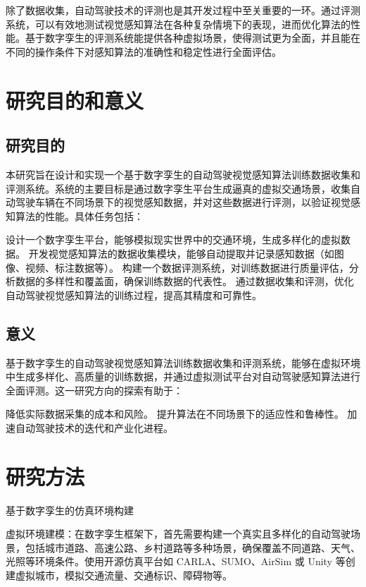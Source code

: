 除了数据收集，自动驾驶技术的评测也是其开发过程中至关重要的一环。通过评测系统，可以有效地测试视觉感知算法在各种复杂情境下的表现，进而优化算法的性能。基于数字孪生的评测系统能提供各种虚拟场景，使得测试更为全面，并且能在不同的操作条件下对感知算法的准确性和稳定性进行全面评估。



\section{研究目的和意义}

\subsection{研究目的}
本研究旨在设计和实现一个基于数字孪生的自动驾驶视觉感知算法训练数据收集和评测系统。系统的主要目标是通过数字孪生平台生成逼真的虚拟交通场景，收集自动驾驶车辆在不同场景下的视觉感知数据，并对这些数据进行评测，以验证视觉感知算法的性能。具体任务包括：

设计一个数字孪生平台，能够模拟现实世界中的交通环境，生成多样化的虚拟数据。
开发视觉感知算法的数据收集模块，能够自动提取并记录感知数据（如图像、视频、标注数据等）。
构建一个数据评测系统，对训练数据进行质量评估，分析数据的多样性和覆盖面，确保训练数据的代表性。
通过数据收集和评测，优化自动驾驶视觉感知算法的训练过程，提高其精度和可靠性。

\subsection{意义}
基于数字孪生的自动驾驶视觉感知算法训练数据收集和评测系统，能够在虚拟环境中生成多样化、高质量的训练数据，并通过虚拟测试平台对自动驾驶感知算法进行全面评测。这一研究方向的探索有助于：

降低实际数据采集的成本和风险。
提升算法在不同场景下的适应性和鲁棒性。
加速自动驾驶技术的迭代和产业化进程。



\section{研究方法}

基于数字孪生的仿真环境构建

虚拟环境建模：在数字孪生框架下，首先需要构建一个真实且多样化的自动驾驶场景，包括城市道路、高速公路、乡村道路等多种场景，确保覆盖不同道路、天气、光照等环境条件。使用开源仿真平台如 CARLA、SUMO、AirSim 或 Unity 等创建虚拟城市，模拟交通流量、交通标识、障碍物等。

